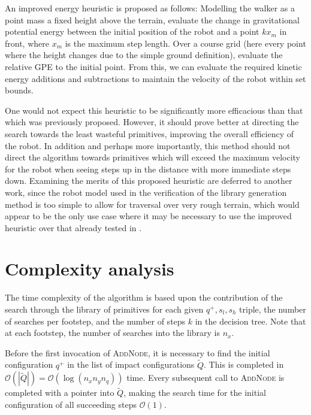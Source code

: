 An improved energy heuristic is proposed as follows: Modelling the walker as a point mass a fixed height above the terrain, evaluate the change in gravitational potential energy between the initial position of the robot and a point $kx_m$ in front, where $x_m$ is the maximum step length. Over a course grid (here every point where the height changes due to the simple ground definition), evaluate the relative GPE to the initial point. From this, we can evaluate the required kinetic energy additions and subtractions to maintain the velocity of the robot within set bounds.
	
One would not expect this heuristic to be significantly more efficacious than that which was previously proposed. However, it should prove better at directing the search towards the least wasteful primitives, improving the overall efficiency of the robot. In addition and perhaps more importantly, this method should not direct the algorithm towards primitives which will exceed the maximum velocity for the robot when seeing steps up in the distance with more immediate steps down. Examining the merits of this proposed heuristic are deferred to another work, since the robot model used in the verification of the library generation method is too simple to allow for traversal over very rough terrain, which would appear to be the only use case where it may be necessary to use the improved heuristic over that already tested in \cite{manchester13planning}.

\section{Complexity analysis} \label{sec:complexity}
The time complexity of the algorithm is based upon the contribution of the search through the library of primitives for each given $q^+,s_l,s_h$ triple, the number of searches per footstep, and the number of steps $k$ in the decision tree. Note that at each footstep, the number of searches into the library is $n_x$.

Before the first invocation of \textsc{AddNode}, it is necessary to find the initial configuration $q^+$ in the list of impact configurations $\tilde{Q}$. This is completed in $\mathcal{O}(|\tilde{Q}|)=\mathcal{O}(\log(n_xn_yn_q))$ time. Every subsequent call to \textsc{AddNode} is completed with a pointer into $\tilde{Q}$, making the search time for the initial configuration of all succeeding steps $\mathcal{O}(1)$.

